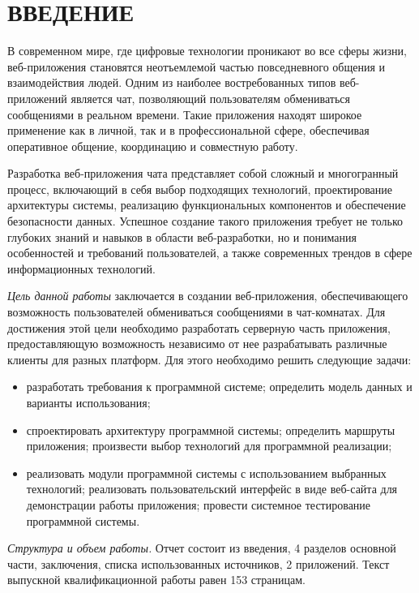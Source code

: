 \section*{ВВЕДЕНИЕ}

В современном мире, где цифровые технологии проникают во все сферы жизни, веб-приложения становятся неотъемлемой частью повседневного общения и взаимодействия людей. Одним из наиболее востребованных типов веб-приложений является чат, позволяющий пользователям обмениваться сообщениями в реальном времени. Такие приложения находят широкое применение как в личной, так и в профессиональной сфере, обеспечивая оперативное общение, координацию и совместную работу.

Разработка веб-приложения чата представляет собой сложный и многогранный процесс, включающий в себя выбор подходящих технологий, проектирование архитектуры системы, реализацию функциональных компонентов и обеспечение безопасности данных. Успешное создание такого приложения требует не только глубоких знаний и навыков в области веб-разработки, но и понимания особенностей и требований пользователей, а также современных трендов в сфере информационных технологий.

\emph{Цель данной работы} заключается в создании веб-приложения, обеспечивающего возможность пользователей обмениваться сообщениями в чат-комнатах. Для достижения этой цели необходимо разработать серверную часть приложения, предоставляющую возможность независимо от нее разрабатывать различные клиенты для разных платформ. Для этого необходимо решить следующие задачи:

\begin{itemize}
	\item разработать требования к программной системе; определить модель данных и варианты использования;
	\item спроектировать архитектуру программной системы; определить маршруты приложения; произвести выбор технологий для программной реализации;
	\item реализовать модули программной системы с использованием выбранных технологий; реализовать пользовательский интерфейс в виде веб-сайта для демонстрации работы приложения; провести системное тестирование программной системы. 
\end{itemize}

\emph{Структура и объем работы.} Отчет состоит из введения, 4 разделов основной части, заключения, списка использованных источников, 2 приложений. Текст выпускной квалификационной работы равен 153 страницам.

